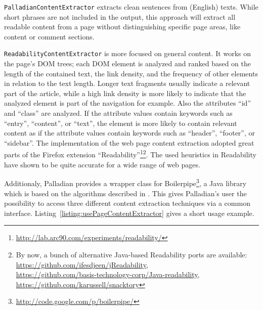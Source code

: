\begin{description}
	
	\item \texttt{PalladianContentExtractor} extracts clean sentences from (English) texts. While short phrases are not included in the output, this approach will extract all readable content from a page without distinguishing specific page areas, like content or comment sections.
	
	\item \texttt{ReadabilityContentExtractor} is more focused on general content. It works on the page's DOM trees; each DOM element is analyzed and ranked based on the length of the contained text, the link density, and the frequency of other elements in relation to the text length. Longer text fragments usually indicate a relevant part of the article, while a high link density is more likely to indicate that the analyzed element is part of the navigation for example. Also the attributes ``id'' and ``class'' are analyzed. If the attribute values contain keywords such as ``entry'', ``content'', or ``text'', the element is more likely to contain relevant content as if the attribute values contain keywords such as ``header'', ``footer'', or ``sidebar''. The implementation of the web page content extraction adopted great parts of the Firefox extension ``Readability''\footnote{\url{http://lab.arc90.com/experiments/readability/}}\footnote{By now, a bunch of alternative Java-based Readability ports are available:\\ \url{https://github.com/ifesdjeen/jReadability},\\ \url{https://github.com/basis-technology-corp/Java-readability},\\ \url{https://github.com/karussell/snacktory}}. The used heuristics in Readability have shown to be quite accurate for a wide range of web pages.
	
\end{description}

Additionaly, Palladian provides a wrapper class for Boilerpipe\footnote{\url{http://code.google.com/p/boilerpipe/}}, a Java library which is based on the algorithms described in \cite{BoilerplateDetectionShallowTextFeatures}. This gives Palladian's user the possibility to access three different content extraction techniques via a common interface. Listing~\ref{listing:usePageContentExtractor} gives a short usage example.

